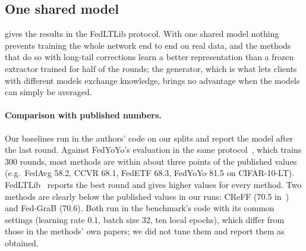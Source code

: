 \subsection{One shared model}\label{sec:res-shared}

 gives the results in the FedLTLib protocol.  With
one shared model nothing prevents training the whole network end to end on real data, and the methods that do so
with long-tail corrections learn a better representation than a frozen extractor trained for half of the rounds;
the generator, which is what lets clients with different models exchange knowledge, brings no advantage when the
models can simply be averaged. 

\paragraph{Comparison with published numbers.} Our baselines run in the authors' code on our splits and report the
model after the last round. Against FedYoYo's evaluation in the same protocol~\cite{yan2025fedyoyo}, which trains
300 rounds, most methods are within about three points of the published values (e.g.\ FedAvg 58.2, CCVR 68.1,
FedETF 68.3, FedYoYo 81.5 on CIFAR-10-LT). FedLTLib~\cite{lin2026fedltlib} reports the best round and gives higher
values for every method. Two methods are clearly below the published values in our runs: CReFF (70.5
in~\cite{yan2025fedyoyo}) and Fed-GraB (70.6). Both run in the benchmark's code with its common settings (learning
rate 0.1, batch size 32, ten local epochs), which differ from those in the methods' own papers; we did not tune them
and report them as obtained.

